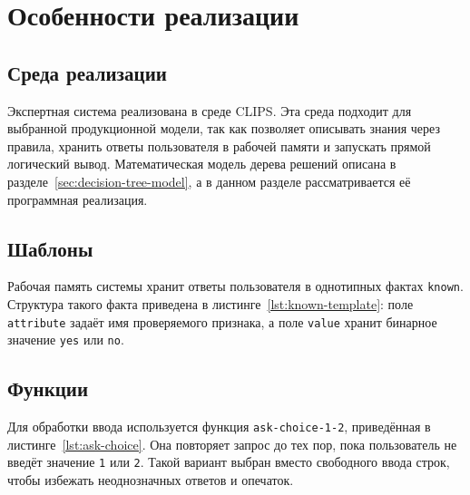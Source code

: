 \section{Особенности реализации}

\subsection{Среда реализации}

Экспертная система реализована в среде CLIPS. Эта среда подходит для выбранной продукционной модели, так как позволяет описывать знания через правила, хранить ответы пользователя в рабочей памяти и запускать прямой логический вывод. Математическая модель дерева решений описана в разделе~\ref{sec:decision-tree-model}, а в данном разделе рассматривается её программная реализация.

\subsection{Шаблоны}

Рабочая память системы хранит ответы пользователя в однотипных фактах \texttt{known}. Структура такого факта приведена в листинге~\ref{lst:known-template}: поле \texttt{attribute} задаёт имя проверяемого признака, а поле \texttt{value} хранит бинарное значение \texttt{yes} или \texttt{no}.


\subsection{Функции}

Для обработки ввода используется функция \texttt{ask-choice-1-2}, приведённая в листинге~\ref{lst:ask-choice}. Она повторяет запрос до тех пор, пока пользователь не введёт значение \texttt{1} или \texttt{2}. Такой вариант выбран вместо свободного ввода строк, чтобы избежать неоднозначных ответов и опечаток.


